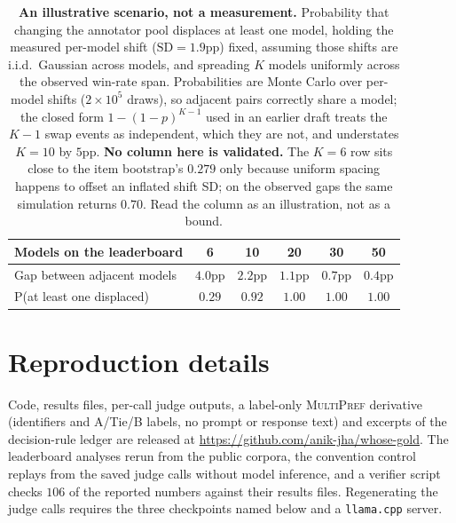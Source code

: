 \documentclass{article}
\begin{document}
\begin{table}[ht]
\centering
\small
\caption{\textbf{An illustrative scenario, not a measurement.} Probability that changing
the annotator pool displaces at least one model, holding the measured per-model shift
($\mathrm{SD} = 1.9$pp) fixed, assuming those shifts are i.i.d.\ Gaussian across models,
and spreading $K$ models uniformly across the observed win-rate span. Probabilities are
Monte Carlo over per-model shifts ($2\times10^{5}$ draws), so adjacent pairs correctly
share a model; the closed form $1-(1-p)^{K-1}$ used in an earlier draft treats the $K-1$
swap events as independent, which they are not, and understates $K=10$ by $5$pp. \textbf{No
column here is validated.} The $K=6$ row sits close to the item bootstrap's $0.279$ only
because uniform spacing happens to offset an inflated shift SD; on the observed gaps the same
simulation returns $0.70$. Read the column as an illustration, not as a bound.}
\label{tab:threshold}
\begin{tabular}{lccccc}
\toprule
Models on the leaderboard & 6 & 10 & 20 & 30 & 50 \\
\midrule
Gap between adjacent models & $4.0$pp & $2.2$pp & $1.1$pp & $0.7$pp & $0.4$pp \\
P(at least one displaced)   & $0.29$  & $0.92$  & $1.00$ & $1.00$ & $1.00$ \\
\bottomrule
\end{tabular}
\end{table}

\section{Reproduction details}\label{app:repro}

Code, results files, per-call judge outputs, a label-only \textsc{MultiPref} derivative
(identifiers and A/Tie/B labels, no prompt or response text) and excerpts of the
decision-rule ledger are released at \url{https://github.com/anik-jha/whose-gold}. The
leaderboard analyses rerun from the public corpora, the convention control replays from the
saved judge calls without model inference, and a verifier script checks $106$ of the
reported numbers against their results files. Regenerating the judge calls requires the three checkpoints named
below and a \texttt{llama.cpp} server.
\end{document}
